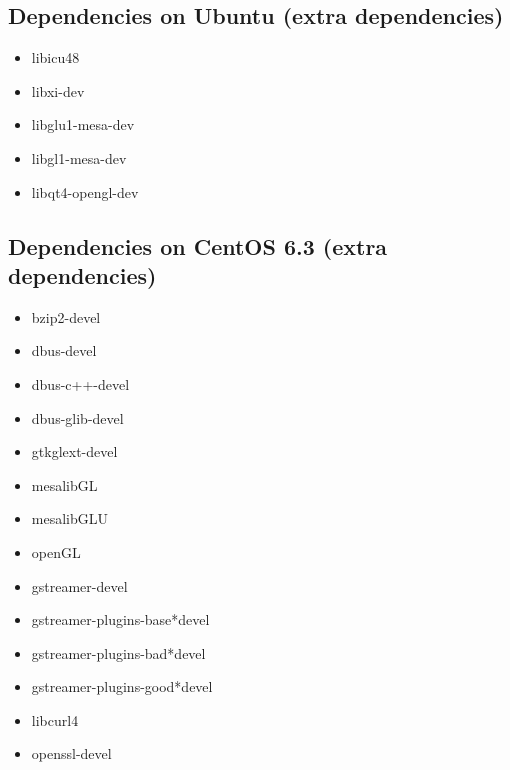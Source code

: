 \documentclass[letterpaper,10pt,english]{sphinxmanual}
\begin{document}
\subsection{Dependencies on Ubuntu (extra dependencies)}
\label{getting_started:dependencies-on-ubuntu-extra-dependencies}\begin{itemize}
\item {} 
libicu48

\item {} 
libxi-dev

\item {} 
libglu1-mesa-dev

\item {} 
libgl1-mesa-dev

\item {} 
libqt4-opengl-dev

\end{itemize}


\subsection{Dependencies on CentOS 6.3 (extra dependencies)}
\label{getting_started:dependencies-on-centos-6-3-extra-dependencies}\begin{itemize}
\item {} 
bzip2-devel

\item {} 
dbus-devel

\item {} 
dbus-c++-devel

\item {} 
dbus-glib-devel

\item {} 
gtkglext-devel

\item {} 
mesalibGL

\item {} 
mesalibGLU

\item {} 
openGL

\item {} 
gstreamer-devel

\item {} 
gstreamer-plugins-base*devel

\item {} 
gstreamer-plugins-bad*devel

\item {} 
gstreamer-plugins-good*devel

\item {} 
libcurl4

\item {} 
openssl-devel

\end{itemize}
\end{document}
